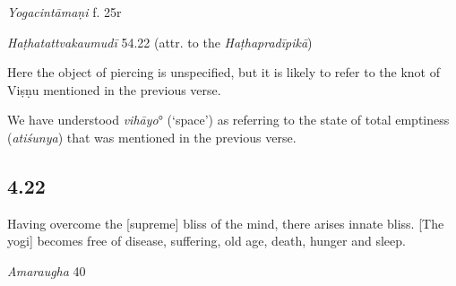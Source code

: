 \begin{ekdosis}
\begin{testimonia}[hp04_021]
\emph{Yogacintāmaṇi} f. 25r
\begin{versinnote}
\end{versinnote}

\emph{Haṭhatattvakaumudī} 54.22 (attr. to the \emph{Haṭhapradīpikā})
\begin{versinnote}
\end{versinnote}
\end{testimonia}

\begin{philcomm}[hp04_021]
Here the object of piercing is unspecified, but it is likely to refer to the knot of Viṣṇu mentioned in the previous verse.

We have understood \emph{vihāyo}° (`space') as referring to the state of total emptiness (\emph{atiśunya}) that was mentioned in the previous verse. 

\end{philcomm}

\subsection*{4.22}
\begin{translation}[hp04_022]
Having overcome the [supreme] bliss of the mind, there arises innate bliss. [The yogi] becomes free of disease, suffering, old age, death, hunger and sleep.
\end{translation}

\begin{sources}[hp04_022]
\emph{Amaraugha} 40
\begin{versinnote}
\tl{\var{paramānanda° ] \emph{Amaraugha}; cittānandaṃ \emph{Amaraughaprabodha}.}\\+}
\tl{\var{°rocitvāt ] \emph{Amaraugha}; tato jitvā \emph{Amaraughaprabodha}}\\!}
\end{versinnote}
\end{sources}


\end{ekdosis}

